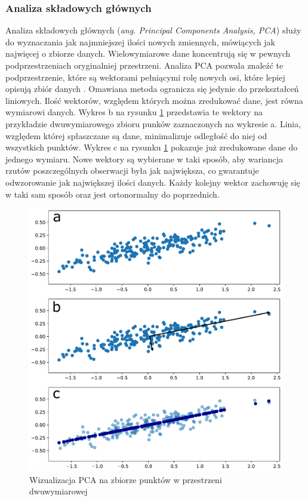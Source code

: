 \documentclass[a4paper,12pt,oneside]{book} %
\begin{document}
\subsubsection{Analiza składowych głównych}
Analiza składowych głównych (\textit{ang. Principal Components Analysis, PCA}) służy do wyznaczania jak najmniejszej ilości nowych zmiennych, mówiących jak najwięcej o zbiorze danych. Wielowymiarowe dane koncentrują się w pewnych podprzestrzeniach oryginalniej przestrzeni. Analiza PCA pozwala znaleźć te podprzestrzenie, które są wektorami pełniącymi rolę nowych osi, które lepiej opisują zbiór danych \cite{redukcjawymiarow}. Omawiana metoda ogranicza się jedynie do przekształceń liniowych. Ilość wektorów, względem których można zredukować dane, jest równa wymiarowi danych. Wykres b na rysunku \ref{fig:pca} przedstawia te wektory na przykładzie dwuwymiarowego zbioru punków zaznaczonych na wykresie a. Linia, względem której spłaszczane są dane, minimalizuje odległość do niej od wszystkich punktów. Wykres c na rysunku \ref{fig:pca} pokazuje już zredukowane dane do jednego wymiaru. Nowe wektory są wybierane w taki sposób, aby wariancja rzutów poszczególnych obserwacji była jak największa, co gwarantuje odwzorowanie jak największej ilości danych. Każdy kolejny wektor zachowuję się w taki sam sposób oraz jest ortonormalny do poprzednich.
\begin{figure}[h!]
	\centering
	\includegraphics[width=15cm]{pca.pdf}
	\caption{Wizualizacja PCA na zbiorze punktów w przestrzeni dwuwymiarowej}
	\label{fig:pca}
\end{figure}
\end{document}
